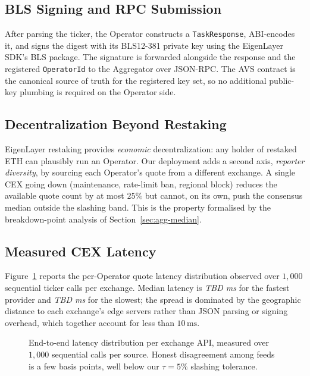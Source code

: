 \subsection{BLS Signing and RPC Submission}

After parsing the ticker, the Operator constructs a
\texttt{TaskResponse}, ABI-encodes it, and signs the digest with its
BLS12-381 private key using the EigenLayer SDK's BLS package.  The
signature is forwarded alongside the response and the registered
\texttt{OperatorId} to the Aggregator over JSON-RPC.  The AVS
contract is the canonical source of truth for the registered key
set, so no additional public-key plumbing is required on the
Operator side.

\subsection{Decentralization Beyond Restaking}

EigenLayer restaking provides \emph{economic} decentralization: any
holder of restaked ETH can plausibly run an Operator.  Our deployment
adds a second axis, \emph{reporter diversity}, by sourcing each
Operator's quote from a different exchange.  A single CEX going down
(maintenance, rate-limit ban, regional block) reduces the available
quote count by at most $25\%$ but cannot, on its own, push the
consensus median outside the slashing band.  This is the property
formalised by the breakdown-point analysis of
Section~\ref{sec:agg-median}.

\subsection{Measured CEX Latency}

Figure~\ref{fig:cex-latency} reports the per-Operator quote latency
distribution observed over $1{,}000$ sequential ticker calls per
exchange.  Median latency is \textit{TBD ms} for the fastest provider
and \textit{TBD ms} for the slowest; the spread is dominated by the
geographic distance to each exchange's edge servers rather than JSON
parsing or signing overhead, which together account for less than
$10\,\mathrm{ms}$.

\begin{figure}[t]
  \centering
  \caption{End-to-end latency distribution per exchange API,
           measured over $1{,}000$ sequential calls per source.
           Honest disagreement among feeds is a few basis points,
           well below our $\tau{=}5\%$ slashing tolerance.}
  \label{fig:cex-latency}
\end{figure}
